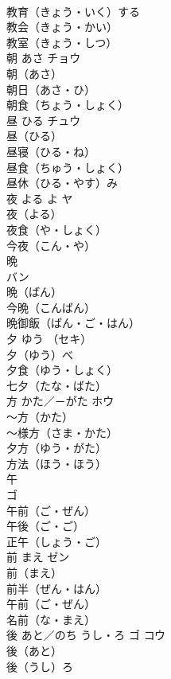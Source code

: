 \documentclass[8pt]{extreport}
\begin{document}
\begin{CJK}{UTF8}{min}
\\	教育（きょう・いく）する　
\\	教会（きょう・かい）　
\\	教室（きょう・しつ）　
\\	朝	あさ	チョウ	
\\	朝（あさ）　
\\	朝日（あさ・ひ）　
\\	朝食（ちょう・しょく）　
\\	昼	ひる	チュウ	
\\	昼（ひる）　
\\	昼寝（ひる・ね）　
\\	昼食（ちゅう・しょく）　
\\	昼休（ひる・やす）み　
\\	夜	よる よ	ヤ	
\\	夜（よる）　
\\	夜食（や・しょく）　
\\	今夜（こん・や）　
\\	晩	
\\	バン	
\\	晩（ばん）　
\\	今晩（こんばん）　
\\	晩御飯（ばん・ご・はん）　
\\	夕	ゆう	（セキ）	
\\	夕（ゆう）べ　
\\	夕食（ゆう・しょく）　
\\	七夕（たな・ばた）　
\\	方	かた／－がた	ホウ	
\\	～方（かた）　
\\	～様方（さま・かた）　
\\	夕方（ゆう・がた）　
\\	方法（ほう・ほう）　
\\	午	
\\	ゴ	
\\	午前（ご・ぜん）　
\\	午後（ご・ご）　 
\\	正午（しょう・ご）　
\\	前	まえ	ゼン	
\\	前（まえ）　
\\	前半（ぜん・はん）　
\\	午前（ご・ぜん）　
\\	名前（な・まえ）　
\\	後	あと／のち うし・ろ	ゴ コウ	
\\	後（あと）　
\\	後（うし）ろ　

\end{CJK}
\end{document}
